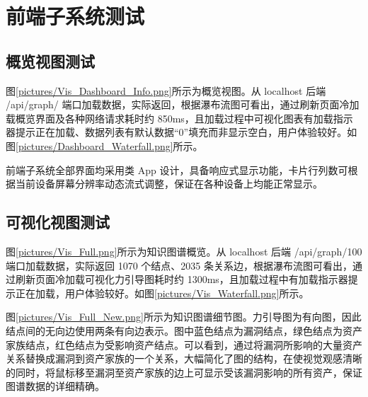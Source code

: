 \documentclass[a4paper,AutoFakeBold,oneside,12pt]{book}
\begin{document}
\section{前端子系统测试}

\subsection{概览视图测试\label{概览视图测试}}

图\ref{pictures/Vis_Dashboard_Info.png}所示为概览视图。从 localhost 后端 /api/graph/ 端口加载数据，实际返回，根据瀑布流图可看出，通过刷新页面冷加载概览界面及各种网络请求耗时约 850ms，且加载过程中可视化图表有加载指示器提示正在加载、数据列表有默认数据“0”填充而非显示空白，用户体验较好。如图\ref{pictures/Dashboard_Waterfall.png}所示。

前端子系统全部界面均采用类 App 设计，具备响应式显示功能，卡片行列数可根据当前设备屏幕分辨率动态流式调整，保证在各种设备上均能正常显示。



\subsection{可视化视图测试\label{可视化视图测试}}

图\ref{pictures/Vis_Full.png}所示为知识图谱概览。从 localhost 后端 /api/graph/100 端口加载数据，实际返回 1070 个结点、2035 条关系边，根据瀑布流图可看出，通过刷新页面冷加载可视化力引导图耗时约 1300ms，且加载过程中有加载指示器提示正在加载，用户体验较好。如图\ref{pictures/Vis_Waterfall.png}所示。



图\ref{pictures/Vis_Full_New.png}所示为知识图谱细节图。力引导图为有向图，因此结点间的无向边使用两条有向边表示。图中蓝色结点为漏洞结点，绿色结点为资产家族结点，红色结点为受影响资产结点。可以看到，通过将漏洞所影响的大量资产关系替换成漏洞到资产家族的一个关系，大幅简化了图的结构，在使视觉观感清晰的同时，将鼠标移至漏洞至资产家族的边上可显示受该漏洞影响的所有资产，保证图谱数据的详细精确。
\end{document}

